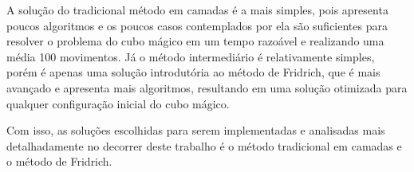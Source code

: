 A solução do tradicional método em camadas é a mais simples, pois apresenta poucos algoritmos e os poucos casos contemplados por ela são suficientes para resolver o problema do cubo mágico em um tempo razoável e realizando uma média 100 movimentos. Já o método intermediário é relativamente simples, porém é apenas uma solução introdutória ao método de Fridrich, que é mais avançado e apresenta mais algoritmos, resultando em uma solução otimizada para qualquer configuração inicial do cubo mágico.

Com isso, as soluções escolhidas para serem implementadas e analisadas mais detalhadamente no decorrer deste trabalho é o método tradicional em camadas e o método de Fridrich.
